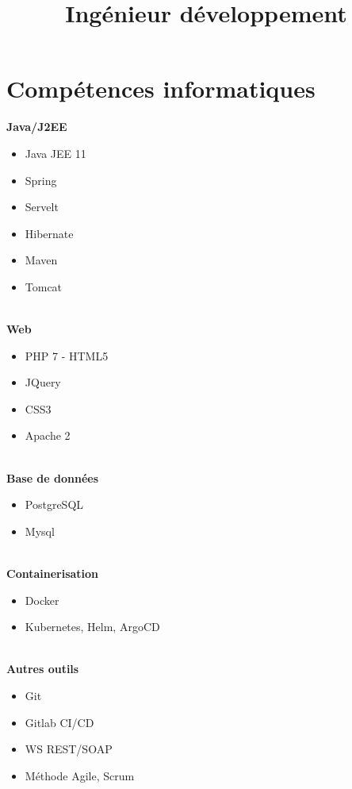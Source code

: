 \documentclass[10pt,a4paper,roman,french]{moderncv}        %
\title{Ingénieur développement}                               %
\begin{document}
\vspace*{-12mm}
\makecvtitle
\vspace*{-8mm}
\section{Compétences informatiques}
\begin{multicols}{2}
\textbf{Java/J2EE} 
\begin{itemize} 
	\item Java JEE 11
	\item Spring
	\item Servelt
	\item Hibernate
	\item Maven
	\item Tomcat
\end{itemize}
\textbf{\\Web} 
\begin{itemize} 
	\item PHP 7 - HTML5
	\item JQuery
	\item CSS3
	\item Apache 2
\end{itemize}
\textbf{\\Base de données} 
\begin{itemize} 
	\item PostgreSQL
	\item Mysql
\end{itemize}
\textbf{\\Containerisation}
\begin{itemize} 
	\item Docker
	\item Kubernetes, Helm, ArgoCD
	
\end{itemize}

\textbf{\\Autres outils} 
\begin{itemize} 
	\item Git
	\item Gitlab CI/CD
	\item WS REST/SOAP
	\item Méthode Agile, Scrum
\end{itemize}
\end{multicols}
\vspace*{-7mm}
\end{document}
